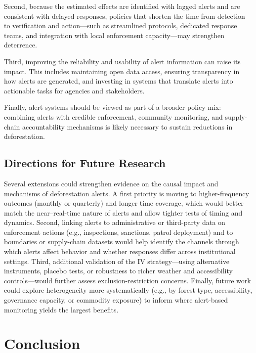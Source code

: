 \documentclass[hidelinks,12pt]{article}
\begin{document}
Second, because the estimated effects are identified with lagged alerts and are consistent with delayed responses, policies that shorten the time from detection to verification and action—such as streamlined protocols, dedicated response teams, and integration with local enforcement capacity—may strengthen deterrence.

Third, improving the reliability and usability of alert information can raise its impact. This includes maintaining open data access, ensuring transparency in how alerts are generated, and investing in systems that translate alerts into actionable tasks for agencies and stakeholders. 

Finally, alert systems should be viewed as part of a broader policy mix: combining alerts with credible enforcement, community monitoring, and supply-chain accountability mechanisms is likely necessary to sustain reductions in deforestation.

\subsection{Directions for Future Research}
\label{sec:discussion_future}

Several extensions could strengthen evidence on the causal impact and mechanisms of deforestation alerts. A first priority is moving to higher-frequency outcomes (monthly or quarterly) and longer time coverage, which would better match the near--real-time nature of alerts and allow tighter tests of timing and dynamics. Second, linking alerts to administrative or third-party data on enforcement actions (e.g., inspections, sanctions, patrol deployment) and to boundaries or supply-chain datasets would help identify the channels through which alerts affect behavior and whether responses differ across institutional settings. Third, additional validation of the IV strategy—using alternative instruments, placebo tests, or robustness to richer weather and accessibility controls—would further assess exclusion-restriction concerns. Finally, future work could explore heterogeneity more systematically (e.g., by forest type, accessibility, governance capacity, or commodity exposure) to inform where alert-based monitoring yields the largest benefits.






\section{Conclusion}
\end{document}
